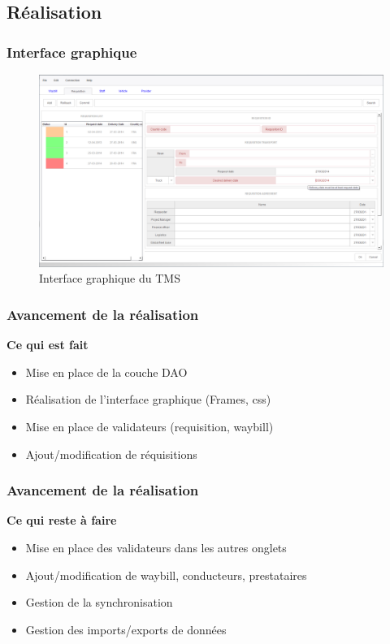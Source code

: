 \subsection{Réalisation}
	\begin{frame}
		\frametitle{Interface graphique}
		\begin{figure}[htbp]
			\centering
			\includegraphics[scale=0.24]{Images/Interface}
			\caption{Interface graphique du TMS}
		\end{figure}
	\end{frame}
	\begin{frame}		
		\frametitle{Avancement de la réalisation}
		\begin{block}{\textbf{Ce qui est fait}}
			\begin{itemize}
				\item Mise en place de la couche DAO
				\item Réalisation de l'interface graphique (Frames, css)
				\item Mise en place de validateurs (requisition, waybill)
				\item Ajout/modification de réquisitions
			\end{itemize}
		\end{block}
	\end{frame}
	\begin{frame}	
		\frametitle{Avancement de la réalisation}
		\begin{block}{\textbf{Ce qui reste à faire}}
			\begin{itemize}
				\item Mise en place des validateurs dans les autres onglets
				\item Ajout/modification de waybill, conducteurs, prestataires
				\item Gestion de la synchronisation
				\item Gestion des imports/exports de données
			\end{itemize}
		\end{block}
	\end{frame}